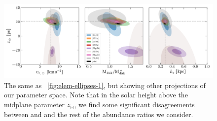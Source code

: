 \documentclass[modern]{aastex63}
\newcommand{\zsun}{\ensuremath{z_\odot}}
\begin{document}
\begin{figure}[!tp]
  \begin{mdframed}
    \color{captiongray}
  \begin{center}
  \includegraphics[width=1\textwidth]{other-error-ellipses.pdf}
  \end{center}
  \caption{%
  The same as \figurename~\ref{fig:elem-ellipses-1}, but showing other
  projections of our parameter space.
  Note that in the solar height above the midplane parameter \zsun, we find
  some significant disagreements between  and
   and the rest of the abundance ratios we consider.
  \label{fig:elem-ellipses-2}
  }
  \end{mdframed}
\end{figure}


\end{document}
